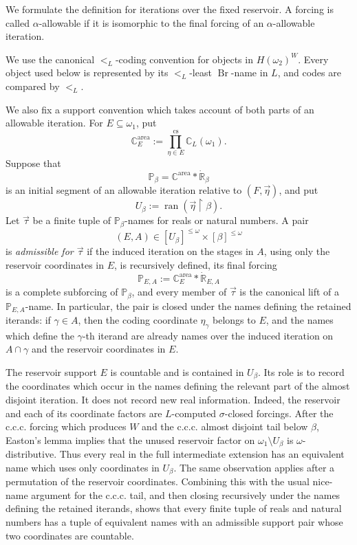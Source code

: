 \documentclass[a4paper,11pt]{article}
\newcommand{\forceP}{\mathbb{P}}
\newcommand{\forceR}{\mathbb{R}}
\newcommand{\forceC}{\mathbb{C}}
\begin{document}
We formulate the definition for iterations over the fixed reservoir.  A forcing is called $\alpha$-allowable if it is isomorphic to the final forcing of an $\alpha$-allowable iteration.

We use the canonical $<_L$-coding convention for objects in $H(\omega_2)^W$.  Every object used below is represented by its $<_L$-least $\operatorname{Br}$-name in $L$, and codes are compared by $<_L$.

We also fix a support convention which takes account of both parts of an allowable iteration.  For $E\subseteq\omega_1$, put
\[
   \forceC^{\mathrm{area}}_E
   :=\prod_{\eta\in E}^{\mathrm{cs}}\mathbb C_L(\omega_1).
\]
Suppose that
\[
   \forceP_\beta
   =\forceC^{\mathrm{area}}*\dot{\forceR}_\beta
\]
is an initial segment of an allowable iteration relative to
$(F,\vec\eta)$, and put
\[
   U_\beta:=\operatorname{ran}(\vec\eta\upharpoonright\beta).
\]
Let $\vec\tau$ be a finite tuple of $\forceP_\beta$-names for reals or
natural numbers.  A pair
\[
   (E,A)\in[U_\beta]^{\leq\omega}\times[\beta]^{\leq\omega}
\]
is \emph{admissible for $\vec\tau$} if the induced iteration on the stages in
$A$, using only the reservoir coordinates in $E$, is recursively defined, its
final forcing
\[
   \forceP_{E,A}
   :=\forceC^{\mathrm{area}}_E*\dot{\forceR}_{E,A}
\]
is a complete subforcing of $\forceP_\beta$, and every member of $\vec\tau$
is the canonical lift of a $\forceP_{E,A}$-name.  In particular, the pair is
closed under the names defining the retained iterands: if $\gamma\in A$, then
the coding coordinate $\eta_\gamma$ belongs to $E$, and the names which define
the $\gamma$-th iterand are already names over the induced iteration on
$A\cap\gamma$ and the reservoir coordinates in $E$.

The reservoir support $E$ is countable and is contained in $U_\beta$.  Its
role is to record the coordinates which occur in the names defining the
relevant part of the almost disjoint iteration.  It does not record new real
information.  Indeed, the reservoir and each of its coordinate factors are
$L$-computed $\sigma$-closed forcings.  After the c.c.c. forcing which
produces $W$ and the c.c.c. almost disjoint tail below $\beta$, Easton's lemma
implies that the unused reservoir factor on
$\omega_1\setminus U_\beta$ is $\omega$-distributive.  Thus every real in the
full intermediate extension has an equivalent name which uses only
coordinates in $U_\beta$.  The same observation applies after a permutation
of the reservoir coordinates.  Combining this with the usual nice-name
argument for the c.c.c. tail, and then closing recursively under the names
defining the retained iterands, shows that every finite tuple of reals and
natural numbers has a tuple of equivalent names with an admissible support pair whose two coordinates are countable.
\end{document}
